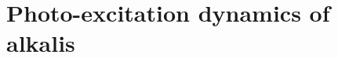 \documentclass[12pt,a4paper,twosides]{book}
\begin{document}
\frontmatter
	\renewcommand{\contentsname}{Table of Contents}
	\tableofcontents
	\cleardoublepage

\mainmatter
%	
%	
	\part{Photo-excitation dynamics of alkalis}
		
		
%		
%		
%	
	\cleardoublepage

\backmatter
	
\end{document}
